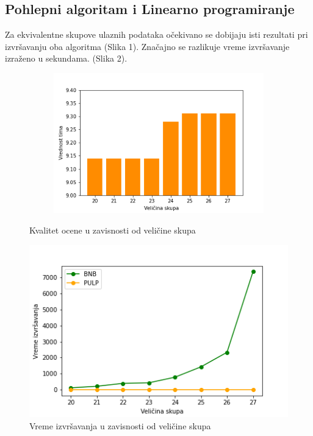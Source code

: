 \documentclass[a4paper]{article}
\begin{document}
\subsection{Pohlepni algoritam i Linearno programiranje}

Za ekvivalentne skupove ulaznih podataka očekivano se dobijaju isti rezultati pri izvršavanju oba algoritma (Slika 1). Značajno se razlikuje vreme izvršavanje izraženo u sekundama. (Slika 2). 


\begin{figure}[H]
    \centering
    \begin{subfigure}{0.6\textwidth}
    \includegraphics[width = \textwidth]{img/performance_bar.png}
    \end{subfigure}
    \caption{Kvalitet ocene u zavisnosti od veličine skupa}
\end{figure}

\begin{figure}[H]
    \centering
    \includegraphics[scale=0.5]{img/exectimes.png}
    \caption{Vreme izvršavanja u zavisnosti od veličine skupa}
    \label{fig:fig1}
\end{figure}
\end{document}
